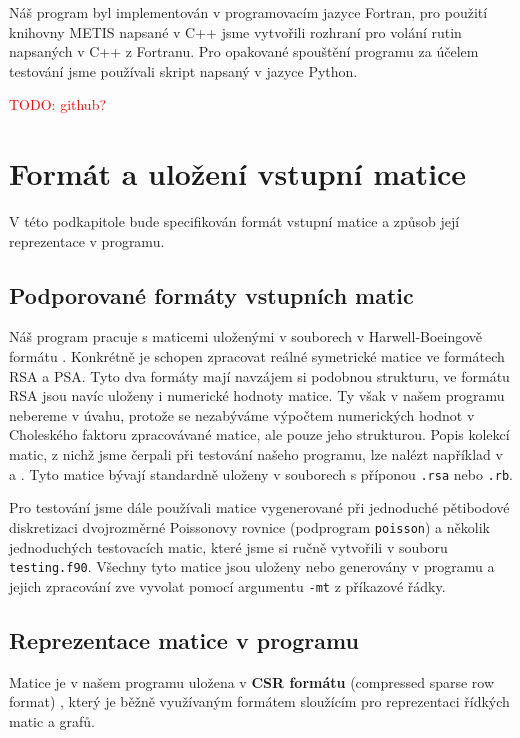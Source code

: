 \documentclass[11pt,american,czech,oneside]{book}
\theoremstyle{plain}
\theoremstyle{definition}
\newcommand{\TODO}[1]{\textcolor{red}{TODO: #1}}
\begin{document}
Náš program byl implementován v programovacím jazyce Fortran, pro použití knihovny METIS napsané v C++ jsme vytvořili rozhraní pro volání rutin napsaných v C++ z Fortranu. Pro opakované spouštění programu za účelem testování jsme používali skript napsaný v jazyce Python.

\TODO{github?}

\section{Formát a uložení vstupní matice}
V této podkapitole bude specifikován formát vstupní matice a způsob její reprezentace v programu.

\subsection{Podporované formáty vstupních matic}

Náš program pracuje s maticemi uloženými v souborech v Harwell-Boeingově formátu \cite{bopo:97}. Konkrétně je schopen zpracovat reálné symetrické matice ve formátech RSA a PSA. Tyto dva formáty mají navzájem si podobnou strukturu, ve formátu RSA jsou navíc uloženy i numerické hodnoty matice. Ty však v našem programu nebereme v úvahu, protože se nezabýváme výpočtem numerických hodnot v Choleského faktoru zpracovávané matice, ale pouze jeho strukturou. Popis kolekcí matic, z nichž jsme čerpali při testování našeho programu, lze nalézt například v \cite{ssmcol} a \cite{hbcol}. Tyto matice bývají standardně uloženy v souborech s příponou \texttt{.rsa} nebo \texttt{.rb}.

Pro testování jsme dále používali matice vygenerované při jednoduché pětibodové diskretizaci dvojrozměrné Poissonovy rovnice (podprogram \texttt{poisson}) a několik jednoduchých testovacích matic, které jsme si ručně vytvořili v souboru \texttt{testing.f90}. Všechny tyto matice jsou uloženy nebo generovány v programu a jejich zpracování zve vyvolat pomocí argumentu \texttt{-mt} z příkazové řádky.

\subsection{Reprezentace matice v programu}
\label{matrixProgReprez}

Matice je v našem programu uložena v \textbf{CSR formátu} (compressed sparse row format) \cite{pis:84,saad:94}, který je běžně využívaným formátem sloužícím pro reprezentaci řídkých matic a grafů.
\end{document}
